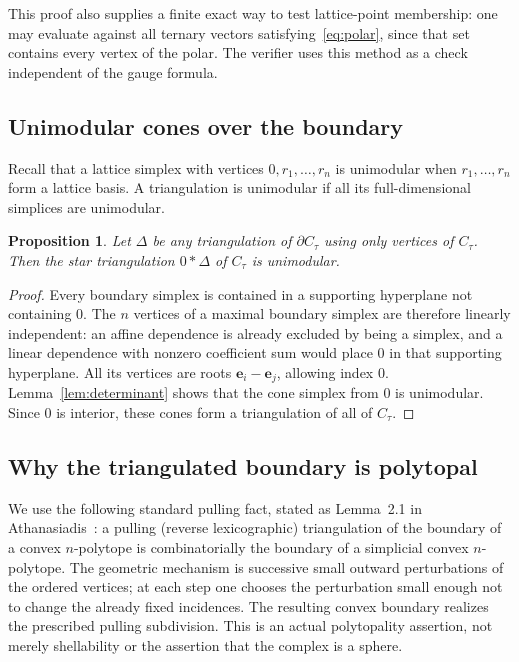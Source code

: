 \documentclass[11pt]{article}
\numberwithin{equation}{section}
\newtheorem{proposition}[theorem]{Proposition}
\theoremstyle{definition}
\newcommand{\ee}{\mathbf e}
\begin{document}
This proof also supplies a finite exact way to test lattice-point membership:
one may evaluate against all ternary vectors satisfying~\eqref{eq:polar},
since that set contains every vertex of the polar. The verifier uses this
method as a check independent of the gauge formula.

\subsection{Unimodular cones over the boundary}

Recall that a lattice simplex with vertices $0,r_1,\ldots,r_n$ is unimodular
when $r_1,\ldots,r_n$ form a lattice basis. A triangulation is unimodular if all
its full-dimensional simplices are unimodular.

\begin{proposition}\label{prop:startriangulation}
Let $\Delta$ be any triangulation of $\partial C_\tau$ using only vertices of
$C_\tau$. Then the star triangulation $0*\Delta$ of $C_\tau$ is unimodular.
\end{proposition}
\begin{proof}
Every boundary simplex is contained in a supporting hyperplane not containing
$0$. The $n$ vertices of a maximal boundary simplex are therefore linearly
independent: an affine dependence is already excluded by being a simplex,
and a linear dependence with nonzero coefficient sum would place $0$ in that
supporting hyperplane. All its vertices are roots
$\ee_i-\ee_j$, allowing index $0$. Lemma~\ref{lem:determinant} shows that the
cone simplex from $0$ is unimodular. Since $0$ is interior, these cones form a
triangulation of all of $C_\tau$.
\end{proof}

\subsection{Why the triangulated boundary is polytopal}

We use the following standard pulling fact, stated as Lemma~2.1
in Athanasiadis~\cite{AthSpecial}: a pulling (reverse lexicographic)
triangulation of the boundary of a convex $n$-polytope is combinatorially the
boundary of a simplicial convex $n$-polytope. The geometric mechanism is
successive small outward perturbations of the ordered vertices; at each step
one chooses the perturbation small enough not to change the already fixed
incidences. The resulting convex boundary realizes the prescribed pulling
subdivision. This is an actual polytopality assertion, not merely shellability
or the assertion that the complex is a sphere.
\end{document}
